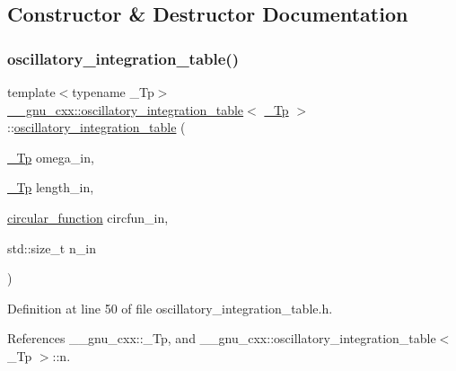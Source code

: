 \subsection{Constructor \& Destructor Documentation}
\mbox{\label{struct____gnu__cxx_1_1oscillatory__integration__table_a0c69a8118986fe8c7de49d824ff26e1f}} 
\subsubsection{\texorpdfstring{oscillatory\+\_\+integration\+\_\+table()}{oscillatory\_integration\_table()}}
{\footnotesize\ttfamily template$<$typename \+\_\+\+Tp$>$ \\
\hyperlink{struct____gnu__cxx_1_1oscillatory__integration__table}{\+\_\+\+\_\+gnu\+\_\+cxx\+::oscillatory\+\_\+integration\+\_\+table}$<$ \hyperlink{namespace____gnu__cxx_a3b19a9c800ca194374ef9172290f7d79}{\+\_\+\+Tp} $>$\+::\hyperlink{struct____gnu__cxx_1_1oscillatory__integration__table}{oscillatory\+\_\+integration\+\_\+table} (\begin{DoxyParamCaption}\item[{\hyperlink{namespace____gnu__cxx_a3b19a9c800ca194374ef9172290f7d79}{\+\_\+\+Tp}}]{omega\+\_\+in,  }\item[{\hyperlink{namespace____gnu__cxx_a3b19a9c800ca194374ef9172290f7d79}{\+\_\+\+Tp}}]{length\+\_\+in,  }\item[{\hyperlink{struct____gnu__cxx_1_1oscillatory__integration__table_aea06e472bb9ff6c535cfdc6a84b14e96}{circular\+\_\+function}}]{circfun\+\_\+in,  }\item[{std\+::size\+\_\+t}]{n\+\_\+in }\end{DoxyParamCaption})\hspace{0.3cm}{\ttfamily [inline]}}



Definition at line 50 of file oscillatory\+\_\+integration\+\_\+table.\+h.



References \+\_\+\+\_\+gnu\+\_\+cxx\+::\+\_\+\+Tp, and \+\_\+\+\_\+gnu\+\_\+cxx\+::oscillatory\+\_\+integration\+\_\+table$<$ \+\_\+\+Tp $>$\+::n.


